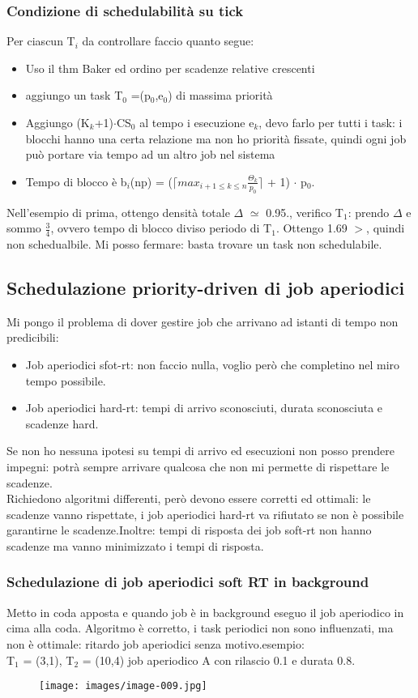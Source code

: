 \documentclass[12pt, oneside]{extbook}
\begin{document}
\subsubsection{Condizione di schedulabilità su tick}
Per ciascun T$_{i}$ da controllare faccio quanto segue:
\begin{itemize}
\item Uso il thm Baker ed ordino per scadenze relative crescenti
\item aggiungo un task T$_{0}$ =(p$_{0}$,e$_{0}$) di massima priorità
\item Aggiungo (K$_{k}$+1)$\cdot$CS$_{0}$ al tempo i esecuzione e$_{k}$, devo farlo per tutti i task: i blocchi hanno una certa relazione ma non ho priorità fissate, quindi ogni job può portare via tempo ad un altro job nel sistema
\item Tempo di blocco è b$_{i}$(np) = ($\lceil max_{i+1 \leq k \leq n}\frac{\Theta_{k}}{p_{0}}\rceil$ + 1) $\cdot$ p$_{0}$.
\end{itemize}
Nell'esempio di prima, ottengo densità totale $\Delta$ $\simeq$ 0.95., verifico T$_{1}$: prendo $\Delta$ e sommo $\frac{3}{4}$, ovvero tempo di blocco diviso periodo di T$_{1}$. Ottengo 1.69 $>$, quindi non schedualbile. Mi posso fermare: basta trovare un task non schedulabile.
\subsection{Schedulazione priority-driven di job aperiodici}
Mi pongo il problema di dover gestire job che arrivano ad istanti di tempo non predicibili:
\begin{itemize}
\item Job aperiodici sfot-rt: non faccio nulla, voglio però che completino nel miro tempo possibile.
\item Job aperiodici hard-rt: tempi di arrivo sconosciuti, durata sconosciuta e scadenze hard.
\end{itemize}
Se non ho nessuna ipotesi su tempi di arrivo ed esecuzioni non posso prendere impegni: potrà sempre arrivare qualcosa che non mi permette di rispettare le scadenze.\\ Richiedono algoritmi differenti, però devono essere corretti ed ottimali: le scadenze vanno rispettate, i job aperiodici hard-rt va rifiutato se non è possibile garantirne le scadenze.Inoltre: tempi di risposta dei job soft-rt non hanno scadenze ma vanno minimizzato i tempi di risposta.
\subsubsection{Schedulazione di job aperiodici soft RT in background}
Metto in coda apposta e quando job è in background eseguo il job aperiodico in cima alla coda. Algoritmo è corretto, i task periodici non sono influenzati, ma non è ottimale: ritardo job aperiodici senza motivo.esempio:\\
T$_{1}$ = (3,1), T$_{2}$ = (10,4) job aperiodico A con rilascio 0.1 e durata 0.8.\\
\begin{figure}[!h]
\centering
\texttt{[image: images/image-009.jpg]}
\end{figure}
\end{document}
